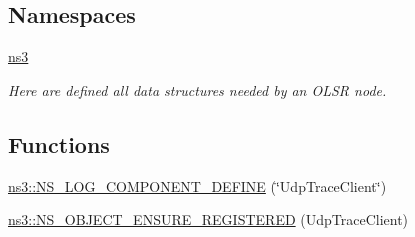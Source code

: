 \subsection*{Namespaces}
\begin{DoxyCompactItemize}
\item 
 \hyperlink{namespacens3}{ns3}
\begin{DoxyCompactList}\small\item\em Here are defined all data structures needed by an O\+L\+SR node. \end{DoxyCompactList}\end{DoxyCompactItemize}
\subsection*{Functions}
\begin{DoxyCompactItemize}
\item 
\hyperlink{namespacens3_aded94493823574f20fb5e3f36598bf48}{ns3\+::\+N\+S\+\_\+\+L\+O\+G\+\_\+\+C\+O\+M\+P\+O\+N\+E\+N\+T\+\_\+\+D\+E\+F\+I\+NE} (\char`\"{}Udp\+Trace\+Client\char`\"{})
\item 
\hyperlink{namespacens3_a7cdeea3cb29eb94bc6378fabfb1f80c3}{ns3\+::\+N\+S\+\_\+\+O\+B\+J\+E\+C\+T\+\_\+\+E\+N\+S\+U\+R\+E\+\_\+\+R\+E\+G\+I\+S\+T\+E\+R\+ED} (Udp\+Trace\+Client)
\end{DoxyCompactItemize}
